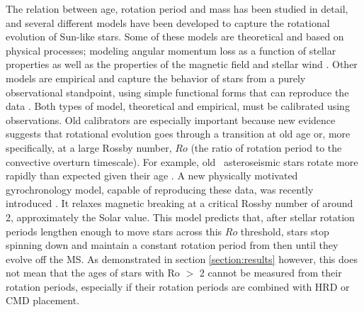 The relation between age, rotation period and mass has been studied in detail,
and several different models have been developed to capture the rotational
evolution of Sun-like stars.
Some of these models are theoretical and based on physical processes; modeling
angular momentum loss as a function of stellar properties as well as the
properties of the magnetic field and stellar wind \citep[\eg][]{kawaler1988,
kawaler1989, vansaders2013, matt2015, vansaders2016}.
Other models are empirical and capture the behavior of stars from a purely
observational standpoint, using simple functional forms that can reproduce the
data \citep[\eg][]{barnes2003, barnes2007, mamajek2008, angus2015}.
Both types of model, theoretical and empirical, must be calibrated using
observations.
Old calibrators are especially important because new evidence suggests that
rotational evolution goes through a transition at old age or, more
specifically, at a large Rossby number, $Ro$ (the ratio of rotation period to
the convective overturn timescale).
For example, old \kepler\ asteroseismic stars rotate more rapidly than
expected given their age \citep{angus2015, vansaders2016}.
A new physically motivated gyrochronology model, capable of reproducing these
data, was recently introduced \citep{vansaders2016}.
It relaxes magnetic breaking at a critical Rossby number of around 2,
approximately the Solar value.
This model predicts that, after stellar rotation periods lengthen enough to
move stars across this $Ro$ threshold, stars stop spinning down and maintain a
constant rotation period from then until they evolve off the MS.
As demonstrated in section \ref{section:results} however, this does not mean
that the ages of stars with Ro $>$ 2 cannot be measured from their rotation
periods, especially if their rotation periods are combined with HRD or CMD
placement.

